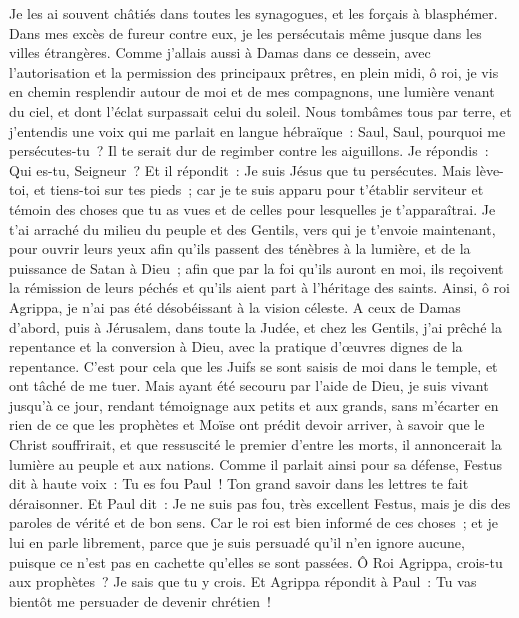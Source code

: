 \begin{multicols}{2}
Je les ai souvent châtiés dans toutes les synagogues, et les forçais à blasphémer. Dans mes excès de fureur contre eux, je les persécutais même jusque dans les villes étrangères.
Comme j'allais aussi à Damas dans ce dessein, avec l'autorisation et la permission des principaux prêtres,
en plein midi, ô roi, je vis en chemin resplendir autour de moi et de mes compagnons, une lumière venant du ciel, et dont l'éclat surpassait celui du soleil.
Nous tombâmes tous par terre, et j'entendis une voix qui me parlait en langue hébraïque~: Saul, Saul, pourquoi me persécutes-tu~? Il te serait dur de regimber contre les aiguillons.
Je répondis~: Qui es-tu, Seigneur~? Et il répondit~: Je suis Jésus que tu persécutes.
Mais lève-toi, et tiens-toi sur tes pieds~; car je te suis apparu pour t'établir serviteur et témoin des choses que tu as vues et de celles pour lesquelles je t'apparaîtrai.
Je t'ai arraché du milieu du peuple et des Gentils, vers qui je t'envoie maintenant,
pour ouvrir leurs yeux afin qu'ils passent des ténèbres à la lumière, et de la puissance de Satan à Dieu~; afin que par la foi qu'ils auront en moi, ils reçoivent la rémission de leurs péchés et qu'ils aient part à l'héritage des saints.
Ainsi, ô roi Agrippa, je n'ai pas été désobéissant à la vision céleste.
A ceux de Damas d'abord, puis à Jérusalem, dans toute la Judée, et chez les Gentils, j'ai prêché la repentance et la conversion à Dieu, avec la pratique d'œuvres dignes de la repentance.
C'est pour cela que les Juifs se sont saisis de moi dans le temple, et ont tâché de me tuer.
Mais ayant été secouru par l'aide de Dieu, je suis vivant jusqu'à ce jour, rendant témoignage aux petits et aux grands, sans m'écarter en rien de ce que les prophètes et Moïse ont prédit devoir arriver,
à savoir que le Christ souffrirait, et que ressuscité le premier d'entre les morts, il annoncerait la lumière au peuple et aux nations.
Comme il parlait ainsi pour sa défense, Festus dit à haute voix~: Tu es fou Paul~! Ton grand savoir dans les lettres te fait déraisonner.
Et Paul dit~: Je ne suis pas fou, très excellent Festus, mais je dis des paroles de vérité et de bon sens.
Car le roi est bien informé de ces choses~; et je lui en parle librement, parce que je suis persuadé qu'il n'en ignore aucune, puisque ce n'est pas en cachette qu'elles se sont passées.
Ô Roi Agrippa, crois-tu aux prophètes~? Je sais que tu y crois.
Et Agrippa répondit à Paul~: Tu vas bientôt me persuader de devenir chrétien~!

\end{multicols}
